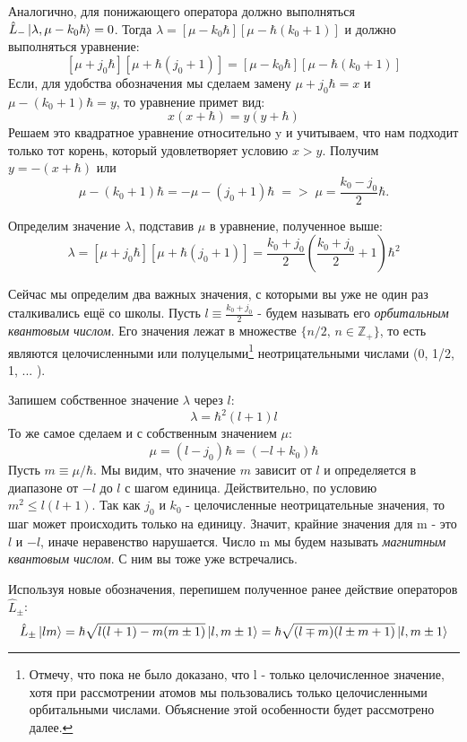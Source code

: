 Аналогично, для понижающего оператора должно выполняться $\hat{L}_-\ket{\lambda,\mu - k_0\hbar} = 0$. Тогда $\lambda = [\mu - k_0\hbar][\mu-\hbar(k_0 + 1)]$ и должно выполняться уравнение:
\[
 [\mu + j_0\hbar][\mu + \hbar(j_0 + 1)]=[\mu - k_0\hbar][\mu-\hbar(k_0 + 1)]
\]
Если, для удобства обозначения мы сделаем замену $\mu + j_0\hbar = x$ и $\mu - (k_0 + 1)\hbar = y$, то уравнение примет вид:
\[
x(x+\hbar) = y(y+\hbar)
\]
Решаем это квадратное уравнение относительно y и учитываем, что нам подходит только тот корень, который удовлетворяет условию $x > y$. Получим $y = -(x + \hbar)$ или 
\[
\mu - (k_0 + 1)\hbar = -\mu - (j_0 + 1)\hbar\; => \; \mu = \frac{k_0 - j_0}{2}\hbar.
\]

Определим значение $\lambda$, подставив $\mu$ в уравнение, полученное выше:
\[
\lambda = [\mu + j_0\hbar][\mu + \hbar(j_0+1)] = \frac{k_0 + j_0}{2}\left(\frac{k_0 + j_0}{2} + 1\right)\hbar^2
\]

Сейчас мы определим два важных значения, с которыми вы уже не один раз сталкивались ещё со школы. Пусть $l\equiv \frac{k_0 + j_0}{2}$ - будем называть его \textit{орбитальным квантовым числом}. Его значения лежат в множестве $\{n/2,\, n\in \mathbb{Z}_+\}$, то есть являются целочисленными или полуцелыми\footnote[1]{Отмечу, что пока не было доказано, что l - только целочисленное значение, хотя при рассмотрении атомов мы пользовались только целочисленными орбитальными числами. Объяснение этой особенности будет рассмотрено далее.} неотрицательными числами (0, 1/2, 1, ... ).

Запишем собственное значение $\lambda$  через $l$:
\[
\lambda = \hbar^2(l+1)l
\]
То же самое сделаем и с собственным значением $\mu$:
\[
\mu = (l - j_0)\hbar = (-l + k_0)\hbar
\]
Пусть $m \equiv \mu/\hbar$. Мы видим, что значение $m$ зависит от $l$ и определяется в диапазоне от $-l$ до $l$ с шагом единица. Действительно, по условию $m^2 \leq l(l+1)$. Так как $j_0$ и $k_0$ - целочисленные неотрицательные значения, то шаг может происходить только на единицу. Значит, крайние значения для m - это $l$ и $-l$, иначе неравенство нарушается. Число m мы будем называть \textit{магнитным квантовым числом}. С ним вы тоже уже встречались.

Используя новые обозначения, перепишем полученное ранее действие операторов $\hat{L}_{\pm}$:
\[
\hat{L}_{\pm}\ket{lm} = \hbar\sqrt{l(l+1) - m(m \pm 1)}\ket{l, m \pm 1} = \hbar\sqrt{(l \mp m)(l \pm m + 1)}\ket{l,m\pm 1}
\]

